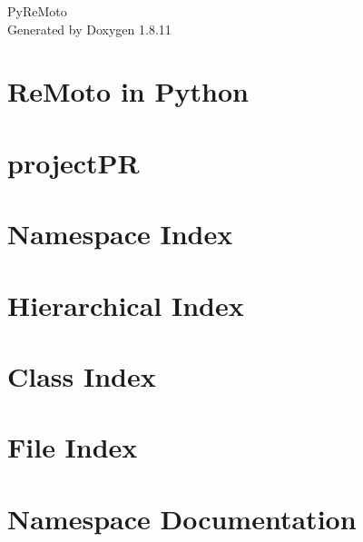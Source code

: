 \documentclass[twoside]{book}
\newcommand{\+}{\discretionary{\mbox{\scriptsize$\hookleftarrow$}}{}{}}
\newcommand{\clearemptydoublepage}{%
  \newpage{\pagestyle{empty}\cleardoublepage}%
}
\begin{document}
\hypersetup{pageanchor=false,
             bookmarksnumbered=true,
             pdfencoding=unicode
            }
\begin{titlepage}
\vspace*{7cm}
\begin{center}%
{\Large Py\+Re\+Moto }\\
\vspace*{1cm}
{\large Generated by Doxygen 1.8.11}\\
\end{center}
\end{titlepage}
\clearemptydoublepage
\tableofcontents
\clearemptydoublepage
{}
\hypersetup{pageanchor=true}

\chapter{Re\+Moto in Python}
\label{index}\hypertarget{index}{}
\chapter{project\+PR}
\label{md__media_renato_Backup_Disk_GitRepositories_remotoPy_projectPR_README}
\hypertarget{md__media_renato_Backup_Disk_GitRepositories_remotoPy_projectPR_README}{}

\chapter{Namespace Index}

\chapter{Hierarchical Index}

\chapter{Class Index}

\chapter{File Index}

\chapter{Namespace Documentation}





















\end{document}
